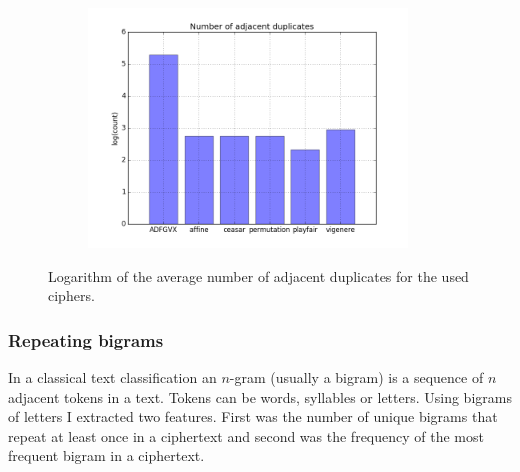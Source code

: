 \documentclass[a4paper]{article}
\begin{document}
\begin{figure}[H]
    \centering
    \begin{subfigure}[h]{0.5\textwidth}
        \centering
        \includegraphics[height=2.5in]{img/no_adj_dups_log.png}
    \end{subfigure}
    \caption{Logarithm of the average number of adjacent duplicates for the used ciphers.}
    \label{fig:adj_dups}
\end{figure}

\subsubsection{Repeating bigrams}
In a classical text classification an $n$-gram (usually a bigram) is a sequence of $n$ adjacent tokens in a text. Tokens can be words, syllables or letters. Using bigrams of letters I extracted two features. First was the number of unique bigrams that repeat at least once in a ciphertext and second was the frequency of the most frequent bigram in a ciphertext.
\end{document}

